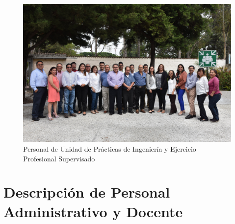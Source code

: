 \documentclass[12pt,spanish,Letterpaper,openany]{book}
\begin{document}
\begin{figure}[H]

{\centering \includegraphics[width=0.78\linewidth]{images/201901-unidadeps-imagen02} 

}

\caption{Personal de Unidad de Prácticas de Ingeniería y Ejercicio Profesional Supervisado}\label{fig:unnamed-chunk-14}
\end{figure}

\hypertarget{descripcion-de-personal-administrativo-y-docente}{%
\section*{Descripción de Personal Administrativo y Docente}\label{descripcion-de-personal-administrativo-y-docente}}
\end{document}
